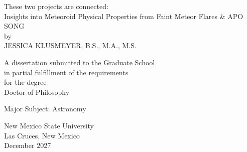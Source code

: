 \begin{center}
These two projects are connected:\\
Insights into Meteoroid Physical Properties from Faint Meteor Flares \& APO SONG \\
\bigskip
by\\
\bigskip
JESSICA KLUSMEYER, B.S., M.A., M.S.
\end{center}
\vspace{1.0in}
\begin{center}
A dissertation submitted to the Graduate School\\
\bigskip
in partial fulfillment of the requirements\\
\bigskip
for the degree\\
\bigskip
Doctor of Philosophy
\end{center}
\bigskip
\begin{center}
Major Subject: Astronomy
\end{center}
\vspace{1.0in}
\begin{center}
New Mexico State University\\
\bigskip
Las Cruces, New Mexico\\
\bigskip
December 2027 %
\end{center}

